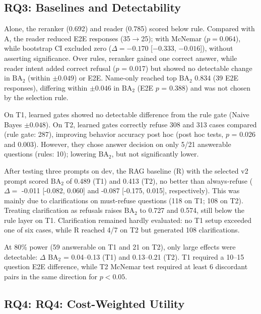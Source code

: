 \documentclass[runningheads]{llncs}
\newcommand{\BA}{\ensuremath{\mathrm{BA}_2}}
\begin{document}
\subsection{RQ3: Baselines and Detectability}

{Alone, the reranker (0.692) and reader (0.785) scored below rule. Compared with A, the reader reduced E2E responses (35$\rightarrow$25); with McNemar ($p=0.064$), while bootstrap CI excluded zero ($\Delta=-0.170$ [$-0.333$, $-0.016$]), without asserting significance. Over rules, reranker gained one correct answer, while reader intent added correct refusal ($p$ = 0.017) but showed no detectable change in \BA{} (within $\pm 0.049$) or E2E. Name-only reached top \BA{} 0.834 (39 E2E responses), differing within $\pm 0.046$ in \BA{} (E2E $p$ = 0.388) and was not chosen by the selection rule.}

{On T1, learned gates showed no detectable difference from the rule gate (Naive Bayes $\pm 0.048$). On T2, learned gates correctly refuse 308 and 313 cases compared (rule gate: 287), improving behavior accuracy post hoc (post hoc tests, $p$ = 0.026 and 0.003). However, they chose answer decision on only 5/21 answerable questions (rules: 10); lowering \BA{}, but not significantly lower.}

{After testing three prompts on dev, the RAG baseline (R) with the selected v2 prompt scored \BA{} of 0.489 (T1) and 0.413 (T2), no better than always-refuse ($\Delta =$ -0.011 [-0.082, 0.060] and -0.087 [-0.175, 0.015], respectively). This was mainly due to clarifications on must-refuse questions (118 on T1; 108 on T2). Treating clarification as refusals raises \BA{} to 0.727 and 0.574, still below the rule layer on T1. Clarification remained hardly evaluated: no T1 setup exceeded one of six cases, while R reached 4/7 on T2 but generated 108 clarifications.}

{At 80\% power (59 answerable on T1 and 21 on T2), only large effects were detectable: $\Delta$ \BA{} = 0.04--0.13 (T1) and 0.13--0.21 (T2). T1 required a 10--15 question E2E difference, while T2 McNemar test required at least 6 discordant pairs in the same direction for $p<0.05$.}

\subsection{RQ4: RQ4: Cost-Weighted Utility}
\end{document}
